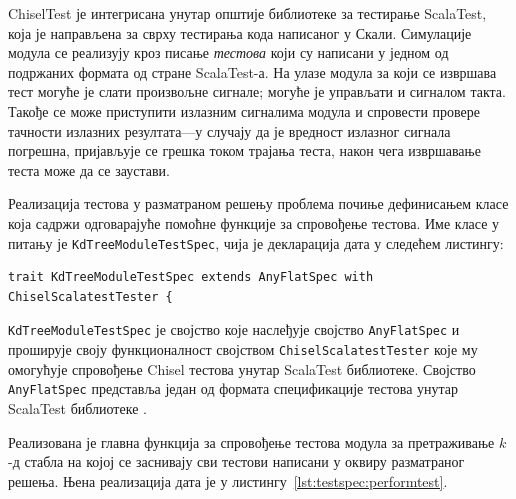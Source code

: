 \documentclass[master]{finthesis}
\newcommand*{\kd}{\texorpdfstring{$k$}{k}-д }
\newcommand*{\prog}[1]{\texttt{#1}}
\begin{document}
ChiselTest је интегрисана унутар општије библиотеке за тестирање ScalaTest, која је направљена за сврху тестирања кода написаног у Скали. Симулације модула се реализују кроз писање \emph{тестова} који су написани у једном од подржаних формата од стране ScalaTest-а. На улазе модула за који се извршава тест могуће је слати произвољне сигнале; могуће је управљати и сигналом такта. Такође се може приступити излазним сигналима модула и спровести провере тачности излазних резултата---у случају да је вредност излазног сигнала погрешна, пријављује се грешка током трајања теста, након чега извршавање теста може да се заустави.

Реализација тестова у разматраном решењу проблема почиње дефинисањем класе која садржи одговарајуће помоћне функције за спровођење тестова. Име класе у питању је \prog{KdTreeModuleTestSpec}, чија је декларација дата у следећем листингу:

\begin{lstlisting}[style=Chisel, caption={Декларација класе \prog{KdTreeModuleTestSpec}.}, label={lst:testspec:decl}]
trait KdTreeModuleTestSpec extends AnyFlatSpec with ChiselScalatestTester {
\end{lstlisting}

\prog{KdTreeModuleTestSpec} је својство које наслеђује својство \prog{AnyFlatSpec} и проширује своју функционалност својством \prog{ChiselScalatestTester} које му омогућује спровођење Chisel тестова унутар ScalaTest библиотеке. Својство \prog{AnyFlatSpec} представља један од формата спецификације тестова унутар ScalaTest библиотеке \cite{scalateststyles}.

Реализована је главна функција за спровођење тестова модула за претраживање \kd стабла на којој се заснивају сви тестови написани у оквиру разматраног решења. Њена реализација дата је у листингу~\ref{lst:testspec:performtest}.
\end{document}
